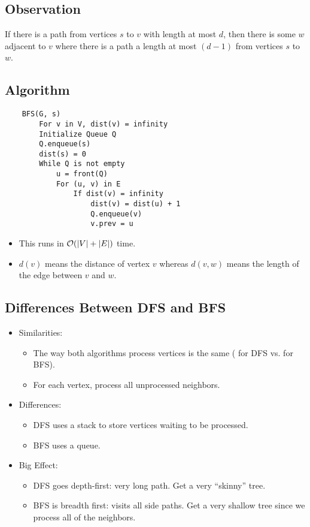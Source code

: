 \documentclass[letterpaper]{article}
\begin{document}
\subsection{Observation}
\begin{proposition}
    If there is a path from vertices $s$ to $v$ with length at most $d$, then there is some $w$ adjacent to $v$ where there is a path a length at most $(d - 1)$ from vertices $s$ to $w$.
\end{proposition} 

\subsection{Algorithm}
\begin{verbatim}
    BFS(G, s)
        For v in V, dist(v) = infinity 
        Initialize Queue Q
        Q.enqueue(s)
        dist(s) = 0
        While Q is not empty
            u = front(Q)
            For (u, v) in E
                If dist(v) = infinity
                    dist(v) = dist(u) + 1
                    Q.enqueue(v)
                    v.prev = u
\end{verbatim}
\begin{itemize}
    \item This runs in $\mathcal{O}(|V| + |E|)$ time. 
    \item $d(v)$ means the distance of vertex $v$ whereas $d(v, w)$ means the length of the edge between $v$ and $w$. 
\end{itemize}

\subsection{Differences Between DFS and BFS}
\begin{itemize}
    \item Similarities:
    \begin{itemize}
        \item The way both algorithms process vertices is the same ( for DFS vs.  for BFS).
        \item For each vertex, process all unprocessed neighbors.
    \end{itemize}
    \item Differences:
    \begin{itemize}
        \item DFS uses a stack to store vertices waiting to be processed. 
        \item BFS uses a queue.
    \end{itemize}
    \item Big Effect:
    \begin{itemize}
        \item DFS goes depth-first: very long path. Get a very ``skinny'' tree. 
        \item BFS is breadth first: visits all side paths. Get a very shallow tree since we process all of the neighbors.
    \end{itemize}
\end{itemize}
\end{document}
